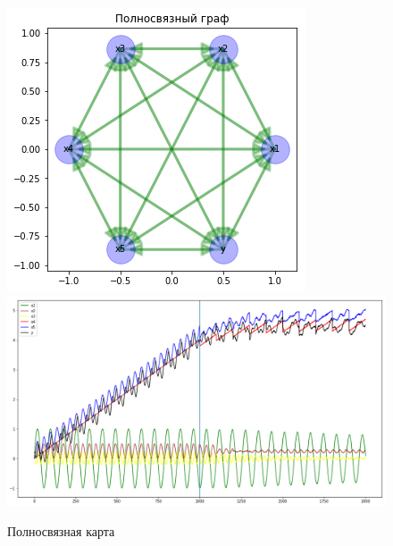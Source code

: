 \begin{figure}
	\centering
	\includegraphics[width=0.7\columnwidth]{./img/lstmfcm_fc.png}
	\includegraphics[width=0.9\columnwidth]{./img/lstmfcm_fc_prediction.png}
	\caption{Полносвязная карта}
	\label{pic:lstmfcm_fc}
\end{figure}

